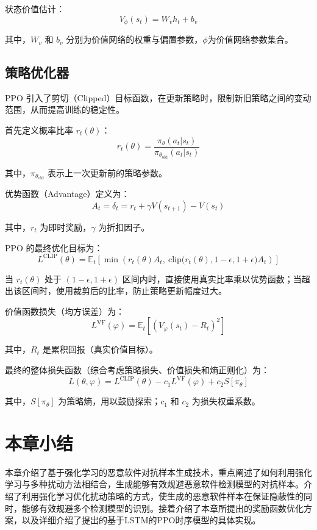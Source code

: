 状态价值估计：
\begin{equation}
V_{\phi}(s_t) = W_v h_t + b_v
\end{equation}

其中，$W_v$ 和 $b_v$ 分别为价值网络的权重与偏置参数，${\phi}$为价值网络参数集合。

\subsection{策略优化器}

PPO 引入了剪切（Clipped）目标函数，在更新策略时，限制新旧策略之间的变动范围，从而提高训练的稳定性。

首先定义概率比率 \(r_t(\theta)\)：
\begin{equation}
	r_t(\theta) = \frac{\pi_{\theta}(a_t | s_t)}{\pi_{\theta_{\text{old}}}(a_t | s_t)} \tag{4.11}
\end{equation}

其中，\(\pi_{\theta_{\text{old}}}\) 表示上一次更新前的策略参数。

优势函数（Advantage）定义为：
\begin{equation}
	A_t = \delta_t = r_t + \gamma V(s_{t+1}) - V(s_t) \tag{4.12}
\end{equation}

其中，\(r_t\) 为即时奖励，\(\gamma\) 为折扣因子。

PPO 的最终优化目标为：
\begin{equation}
	L^{\text{CLIP}}(\theta) = \mathbb{E}_t \left[ \min \left( r_t(\theta) A_t, \ \text{clip}\big(r_t(\theta), 1-\epsilon, 1+\epsilon\big) A_t \right) \right] \tag{4.13}
\end{equation}

当 \(r_t(\theta)\) 处于 \((1-\epsilon, 1+\epsilon)\) 区间内时，直接使用真实比率乘以优势函数；当超出该区间时，使用裁剪后的比率，防止策略更新幅度过大。

价值函数损失（均方误差）为：
\begin{equation}
	L^{\text{VF}}(\varphi) = \mathbb{E}_t \left[ \left(V_{\varphi}(s_t) - R_t\right)^2 \right] \tag{4.14}
\end{equation}

其中，\(R_t\) 是累积回报（真实价值目标）。

最终的整体损失函数（综合考虑策略损失、价值损失和熵正则化）为：
\begin{equation}
	L(\theta, \varphi) = L^{\text{CLIP}}(\theta) - c_1 L^{\text{VF}}(\varphi) + c_2 S[\pi_{\theta}] \tag{4.15}
\end{equation}

其中，\(S[\pi_{\theta}]\) 为策略熵，用以鼓励探索；\(c_1\) 和 \(c_2\) 为损失权重系数。

\section{本章小结}

本章介绍了基于强化学习的恶意软件对抗样本生成技术，重点阐述了如何利用强化学习与多种扰动方法相结合，生成能够有效规避恶意软件检测模型的对抗样本。介绍了利用强化学习优化扰动策略的方式，使生成的恶意软件样本在保证隐蔽性的同时，能够有效规避多个检测模型的识别。接着介绍了本章所提出的奖励函数优化方案，以及详细介绍了提出的基于LSTM的PPO时序模型的具体实现。





